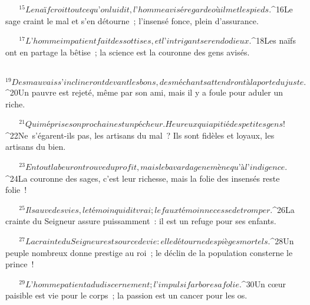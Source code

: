            
         
${}^{15}Le naïf croit tout ce qu’on lui dit,
        l’homme avisé regarde où il met les pieds.
        
           
         
${}^{16}Le sage craint le mal et s’en détourne ;
        l’insensé fonce, plein d’assurance.
        
           
         
${}^{17}L’homme impatient fait des sottises,
        et l’intrigant se rend odieux.
        
           
         
${}^{18}Les naïfs ont en partage la bêtise ;
        la science est la couronne des gens avisés.
        
           
         
${}^{19}Des mauvais s’inclineront devant les bons,
        des méchants attendront à la porte du juste.
        
           
         
${}^{20}Un pauvre est rejeté, même par son ami,
        mais il y a foule pour aduler un riche.
        
           
         
${}^{21}Qui méprise son prochain est un pécheur.
        Heureux qui a pitié des petites gens !
        
           
         
${}^{22}Ne s’égarent-ils pas, les artisans du mal ?
        Ils sont fidèles et loyaux, les artisans du bien.
        
           
         
${}^{23}En tout labeur on trouve du profit,
        mais le bavardage ne mène qu’à l’indigence.
        
           
         
${}^{24}La couronne des sages, c’est leur richesse,
        mais la folie des insensés reste folie !
        
           
         
${}^{25}Il sauve des vies, le témoin qui dit vrai ;
        le faux témoin ne cesse de tromper.
        
           
         
${}^{26}La crainte du Seigneur assure puissamment :
        il est un refuge pour ses enfants.
        
           
         
${}^{27}La crainte du Seigneur est source de vie :
        elle détourne des pièges mortels.
        
           
         
${}^{28}Un peuple nombreux donne prestige au roi ;
        le déclin de la population consterne le prince !
        
           
         
${}^{29}L’homme patient a du discernement ;
        l’impulsif arbore sa folie.
        
           
         
${}^{30}Un cœur paisible est vie pour le corps ;
        la passion est un cancer pour les os.
        
